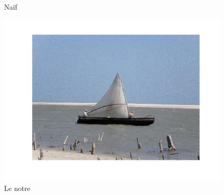 \documentclass{article}
\begin{document}
\begin{figure}[h]
\begin{minipage}{0.33\textwidth}
\caption{Naïf}
\end{minipage}%
\begin{minipage}{0.33\textwidth}
\centering
\includegraphics[width=1\textwidth]{images/boat_conc_tmr.jpg}
\caption{Le notre}
\end{minipage}
\end{figure}
\end{document}
